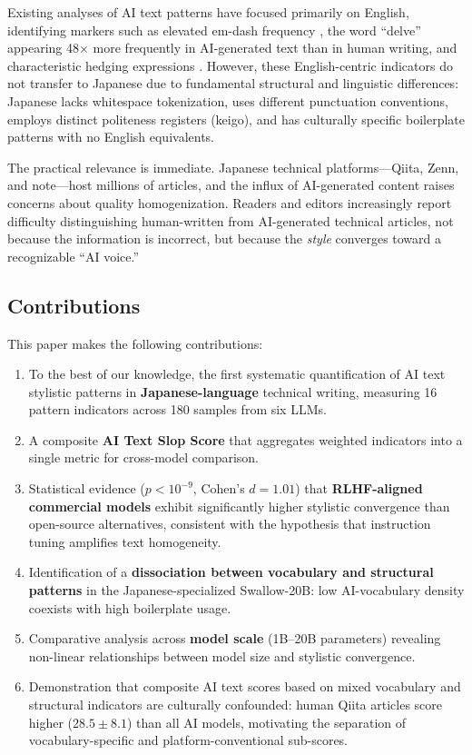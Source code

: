 \documentclass[11pt,a4paper]{article}
\begin{document}
Existing analyses of AI text patterns have focused primarily on English, identifying markers such as elevated em-dash frequency \cite{liang2024}, the word ``delve'' appearing 48$\times$ more frequently in AI-generated text than in human writing, and characteristic hedging expressions \cite{guo2024}. However, these English-centric indicators do not transfer to Japanese due to fundamental structural and linguistic differences: Japanese lacks whitespace tokenization, uses different punctuation conventions, employs distinct politeness registers (keigo), and has culturally specific boilerplate patterns with no English equivalents.

The practical relevance is immediate. Japanese technical platforms---Qiita, Zenn, and note---host millions of articles, and the influx of AI-generated content raises concerns about quality homogenization. Readers and editors increasingly report difficulty distinguishing human-written from AI-generated technical articles, not because the information is incorrect, but because the \textit{style} converges toward a recognizable ``AI voice.''

\subsection{Contributions}

This paper makes the following contributions:

\begin{enumerate}
    \item To the best of our knowledge, the first systematic quantification of AI text stylistic patterns in \textbf{Japanese-language} technical writing, measuring 16 pattern indicators across 180 samples from six LLMs.
    \item A composite \textbf{AI Text Slop Score} that aggregates weighted indicators into a single metric for cross-model comparison.
    \item Statistical evidence ($p < 10^{-9}$, Cohen's $d = 1.01$) that \textbf{RLHF-aligned commercial models} exhibit significantly higher stylistic convergence than open-source alternatives, consistent with the hypothesis that instruction tuning amplifies text homogeneity.
    \item Identification of a \textbf{dissociation between vocabulary and structural patterns} in the Japanese-specialized Swallow-20B: low AI-vocabulary density coexists with high boilerplate usage.
    \item Comparative analysis across \textbf{model scale} (1B--20B parameters) revealing non-linear relationships between model size and stylistic convergence.
    \item Demonstration that composite AI text scores based on mixed vocabulary and structural indicators are culturally confounded: human Qiita articles score higher ($28.5 \pm 8.1$) than all AI models, motivating the separation of vocabulary-specific and platform-conventional sub-scores.
\end{enumerate}
\end{document}
